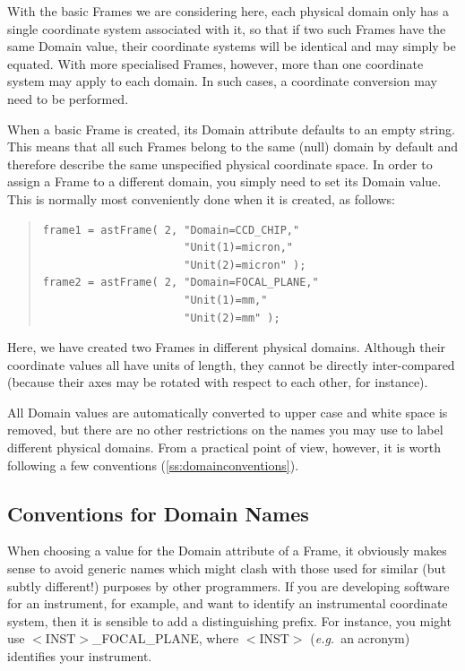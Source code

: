 \documentclass[twoside,11pt]{article}
\newcommand{\htmlref}[2]{#1}
\newcommand{\secref}[1]{\S\ref{#1}}
\renewcommand{\secref}[1]{\ref{#1}}
\begin{document}
With the basic Frames we are considering here, each physical domain
only has a single coordinate system associated with it, so that if two
such Frames have the same Domain value, their coordinate systems will
be identical and may simply be equated. With more specialised Frames,
however, more than one coordinate system may apply to each domain. In
such cases, a coordinate conversion may need to be performed.

When a basic Frame is created, its Domain attribute defaults to an
empty string. This means that all such Frames belong to the same
(null) domain by default and therefore describe the same unspecified
physical coordinate space. In order to assign a Frame to a different
domain, you simply need to set its Domain value. This is normally most
conveniently done when it is created, as follows:

\begin{quote}
\small
\begin{verbatim}
frame1 = astFrame( 2, "Domain=CCD_CHIP,"
                      "Unit(1)=micron,"
                      "Unit(2)=micron" );
frame2 = astFrame( 2, "Domain=FOCAL_PLANE,"
                      "Unit(1)=mm,"
                      "Unit(2)=mm" );
\end{verbatim}
\normalsize
\end{quote}

Here, we have created two Frames in different physical
domains. Although their coordinate values all have units of length,
they cannot be directly inter-compared (because their axes may be
rotated with respect to each other, for instance).

All Domain values are automatically converted to upper case and white
space is removed, but there are no other restrictions on the names you
may use to label different physical domains. From a practical point of
view, however, it is worth following a few conventions
(\secref{ss:domainconventions}).

\subsection{\label{ss:domainconventions}Conventions for Domain Names}

When choosing a value for the \htmlref{Domain}{Domain} attribute of a \htmlref{Frame}{Frame}, it
obviously makes sense to avoid generic names which might clash with
those used for similar (but subtly different!) purposes by other
programmers. If you are developing software for an instrument, for
example, and want to identify an instrumental coordinate system, then
it is sensible to add a distinguishing prefix. For instance, you might
use $<$INST$>$\_FOCAL\_PLANE, where $<$INST$>$ ({\em{e.g.}}\ an
acronym) identifies your instrument.
\end{document}
